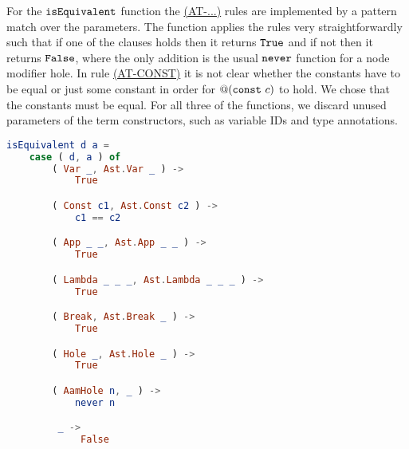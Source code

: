 For the $\texttt{isEquivalent}$ function the
\hyperref[fig:conditionreductionrules]{(AT-...)} rules are implemented by a
pattern match over the parameters.
The function applies the rules very straightforwardly such that if one of the
clauses holds then it returns $\texttt{True}$ and if not then it returns
$\texttt{False}$, where the only addition is the usual $\texttt{never}$ function
for a node modifier hole. In rule
\hyperref[fig:conditionreductionrules]{(AT-CONST)} it is not clear whether the
constants have to be equal or just some constant in order for $@(\texttt{const}~c)$ to
hold. We chose that the constants must be equal.
For all three of the functions, we discard unused parameters of the term
constructors, such as variable IDs and type annotations.
\begin{lstlisting}[language=elm,%
                   label="eval-aam-isequivalent",%
                   gobble=0,%
                   ]
isEquivalent d a =
    case ( d, a ) of
        ( Var _, Ast.Var _ ) ->
            True

        ( Const c1, Ast.Const c2 ) ->
            c1 == c2

        ( App _ _, Ast.App _ _ ) ->
            True

        ( Lambda _ _ _, Ast.Lambda _ _ _ ) ->
            True

        ( Break, Ast.Break _ ) ->
            True

        ( Hole _, Ast.Hole _ ) ->
            True

        ( AamHole n, _ ) ->
            never n

         _ ->
             False

\end{lstlisting}

